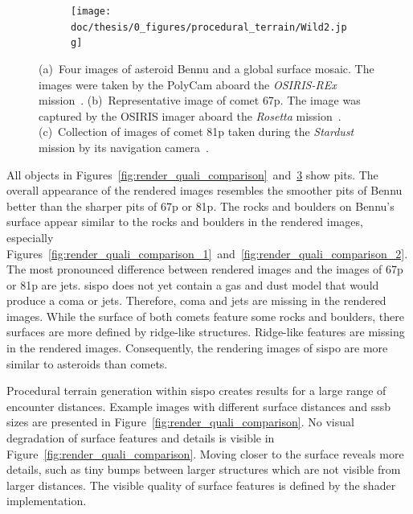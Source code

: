 \begin{figure}[htb]
\begin{subfigure}[b]{0.425\textwidth}
        \caption{}
        \label{fig:render_quali_67p}
    \end{subfigure} %
    \begin{subfigure}[b]{0.564\textwidth}
        \centering
        \texttt{[image: doc/thesis/0\_figures/procedural\_terrain/Wild2.jpg]}
        \caption{}
        \label{fig:render_quali_81p}
    \end{subfigure}
    \caption{(a)~Four images of asteroid Bennu and a global surface mosaic. The images were taken by the PolyCam aboard the \textit{OSIRIS-REx} mission~\cite{NASAFourBennu}. (b)~Representative image of comet \acrlong{67p}. The image was captured by the OSIRIS imager aboard the \textit{Rosetta} mission~\cite{OSIRISArchiveb}. (c)~Collection of images of comet \acrlong{81p} taken during the \textit{Stardust} mission by its navigation camera~\cite{StardustImages}.}
    \label{fig:render_quali}
\end{figure}

All objects in Figures~\ref{fig:render_quali_comparison}~and~\ref{fig:render_quali} show pits. The overall appearance of the rendered images resembles the smoother pits of Bennu better than the sharper pits of \gls{67p} or \gls{81p}. The rocks and boulders on Bennu's surface appear similar to the rocks and boulders in the rendered images, especially Figures~\ref{fig:render_quali_comparison_1}~and~\ref{fig:render_quali_comparison_2}. The most pronounced difference between rendered images and the images of \gls{67p} or \gls{81p} are jets. \Gls{sispo} does not yet contain a gas and dust model that would produce a coma or jets. Therefore, coma and jets are missing in the rendered images. While the surface of both comets feature some rocks and boulders, there surfaces are more defined by ridge-like structures. Ridge-like features are missing in the rendered images. Consequently, the rendering images of \gls{sispo} are more similar to asteroids than comets.

Procedural terrain generation within \gls{sispo} creates results for a large range of encounter distances. Example images with different surface distances and \gls{sssb} sizes are presented in Figure~\ref{fig:render_quali_comparison}. No visual degradation of surface features and details is visible in Figure~\ref{fig:render_quali_comparison}. Moving closer to the surface reveals more details, such as tiny bumps between larger structures which are not visible from larger distances. The visible quality of surface features is defined by the shader implementation. 

